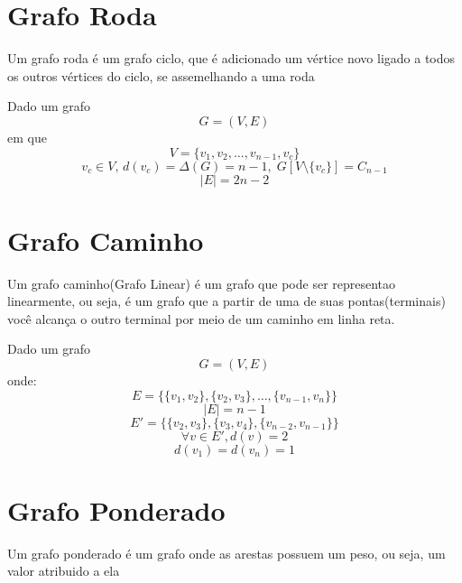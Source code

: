 \documentclass{report}
\begin{document}
\section{Grafo Roda}
Um grafo roda é um grafo ciclo, que é adicionado um vértice novo ligado a todos os outros vértices do ciclo, se assemelhando a uma roda


\begin{center}
\end{center}
{
	Dado um grafo
	\[
		G = (V,E)
	\]
	em que
	\[
		V = \{v_1, v_2, \dots, v_{n-1}, v_c\}
	\]
	\[
		v_c \in V, \,d(v_c) = \Delta(G) = n -1,  \; G[V \setminus \{ v_c\}] = C_{n-1}
	\]
	\[
		|E| = 2n - 2
	\]
}
\section{Grafo Caminho}
{
Um grafo caminho(Grafo Linear) é um grafo que pode ser representao linearmente, ou seja, é um grafo que a partir de uma de suas pontas(terminais) você alcança o outro terminal por meio de um caminho em linha reta.
\begin{center}
\end{center}
{
Dado um grafo
\[
	G = (V,E)
\]
onde:
\[
E = \{\{v_1, v_2\}, \{v_2, v_3\}, \dots, \{v_{n-1}, v_n\}\}
\]
\[
	|E| = n-1
\]
\[
	E' = \{ \{v_2, v_3\},\{v_3, v_4\},\{v_{n-2}, v_{n-1}\}\}
\]
\[
	\forall v \in E', d(v) = 2
\]
\[
	d(v_1) = d(v_n) = 1
\]

}
}
\section{Grafo Ponderado}
	Um grafo ponderado é um grafo onde as arestas possuem um peso, ou seja, um valor atribuido a ela
\end{document}
